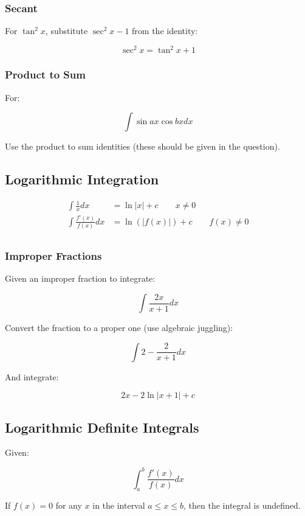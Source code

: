 \documentclass[a4paper,11pt]{article}
\begin{document}
\subsubsection{Secant}

For $\tan^2{x}$, substitute $\sec^2{x} - 1$ from the identity:

$$
\sec^2{x} = \tan^2{x} + 1
$$


\subsubsection{Product to Sum}

For:

$$
\int \sin{ax}\cos{bx} dx
$$

Use the product to sum identities (these should be given in the question).




\subsection{Logarithmic Integration}

$$
\begin{aligned}
\int \frac{1}{x} dx & = \ln{|x|} + c \qquad x \neq 0 \\
\int \frac{f'(x)}{f(x)} dx & = \ln(|f(x)|) + c \qquad f(x) \neq 0 \\
\end{aligned}
$$

\subsubsection{Improper Fractions}

Given an improper fraction to integrate:

$$
\int \frac{2x}{x + 1} dx
$$

Convert the fraction to a proper one (use algebraic juggling):

$$
\int 2 - \frac{2}{x + 1} dx
$$

And integrate:

$$
2x - 2\ln{|x + 1|} + c
$$


\subsection{Logarithmic Definite Integrals}

Given:

$$
\int_a^b \frac{f'(x)}{f(x)} dx
$$

If $f(x) = 0$ for any $x$ in the interval $a \leq x \leq b$, then the integral
is undefined.
\end{document}
